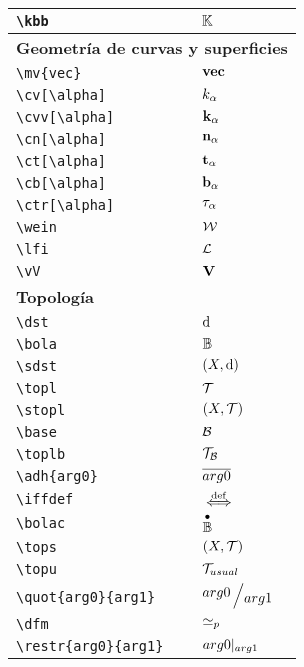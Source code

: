 \begin{longtable}{|p{3.5cm}|p{2cm}|}
\verb|\kbb| & $\displaystyle\kbb$ \\ \midrule 
\bottomrule \multicolumn{2}{|p{5.5cm}|}{\textbf{Geometría de curvas y superficies}} \\ \toprule 
\verb|\mv{vec}| & $\displaystyle\mv{vec}$ \\ \midrule 
\verb|\cv[\alpha]| & $\displaystyle\cv[\alpha]$ \\ \midrule 
\verb|\cvv[\alpha]| & $\displaystyle\cvv[\alpha]$ \\ \midrule 
\verb|\cn[\alpha]| & $\displaystyle\cn[\alpha]$ \\ \midrule 
\verb|\ct[\alpha]| & $\displaystyle\ct[\alpha]$ \\ \midrule 
\verb|\cb[\alpha]| & $\displaystyle\cb[\alpha]$ \\ \midrule 
\verb|\ctr[\alpha]| & $\displaystyle\ctr[\alpha]$ \\ \midrule 
\verb|\wein| & $\displaystyle\wein$ \\ \midrule 
\verb|\lfi| & $\displaystyle\lfi$ \\ \midrule 
\verb|\vV| & $\displaystyle\vV$ \\ \midrule 
\bottomrule \multicolumn{2}{|p{5.5cm}|}{\textbf{Topología}} \\ \toprule 
\verb|\dst| & $\displaystyle\dst$ \\ \midrule 
\verb|\bola| & $\displaystyle\bola$ \\ \midrule 
\verb|\sdst| & $\displaystyle\sdst$ \\ \midrule 
\verb|\topl| & $\displaystyle\topl$ \\ \midrule 
\verb|\stopl| & $\displaystyle\stopl$ \\ \midrule 
\verb|\base| & $\displaystyle\base$ \\ \midrule 
\verb|\toplb| & $\displaystyle\toplb$ \\ \midrule 
\verb|\adh{arg0}| & $\displaystyle\adh{arg0}$ \\ \midrule 
\verb|\iffdef| & $\displaystyle\iffdef$ \\ \midrule 
\verb|\bolac| & $\displaystyle\bolac$ \\ \midrule 
\verb|\tops| & $\displaystyle\tops$ \\ \midrule 
\verb|\topu| & $\displaystyle\topu$ \\ \midrule 
\verb|\quot{arg0}{arg1}| & $\displaystyle\quot{arg0}{arg1}$ \\ \midrule 
\verb|\dfm| & $\displaystyle\dfm$ \\ \midrule 
\verb|\restr{arg0}{arg1}| & $\displaystyle\restr{arg0}{arg1}$ \\ \midrule 

\end{longtable}

